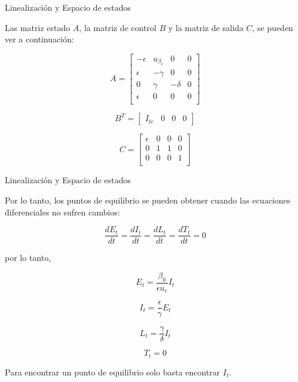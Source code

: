 \documentclass{beamer}
\begin{document}
\begin{frame}{Linealización y Espacio de estados}
\begin{justify}


{\footnotesize

Las matriz estado $A$, la matriz de control $B$ y la matriz de salida $C$, se pueden ver a continuación:

$$
A = \begin{bmatrix}
-\epsilon & u_{\beta_{e}} & 0 & 0  \\
\epsilon & -\gamma & 0 & 0  \\
0 & \gamma  & -\delta & 0 \\
\epsilon & 0 & 0 & 0 \\
\end{bmatrix}
$$

\vspace{0.3cm}

$$
B^T = \begin{bmatrix}
I_{te} & 0 & 0 & 0
\end{bmatrix}
$$

\vspace{0.3cm}

$$
C = \begin{bmatrix}
\epsilon & 0 & 0 & 0  \\
0 & 1 & 1 & 0  \\
0 & 0  & 0 & 1 \\
\end{bmatrix}
$$
}

\end{justify}
\end{frame}



\begin{frame}{Linealización y Espacio de estados}
\begin{justify}


{\footnotesize

Por lo tanto, los puntos de equilibrio se pueden obtener cuando las ecuaciones diferenciales no sufren cambios:


$$\frac{dE_{t}}{dt} = \frac{dI_{t}}{dt} = \frac{dL_{t}}{dt} = \frac{dT_{t}}{dt} = 0$$

por lo tanto,

$$E_{t}=\frac{\beta_{0}}{\epsilon u_e}I_{t}$$

$$I_{t}=\frac{\epsilon}{\gamma}E_{t}$$

$$L_{t}=\frac{\gamma}{\delta}I_{t}$$

$$T_{t} = 0 $$

Para encontrar un punto de equilibrio solo basta encontrar $I_{t}$.
}

\end{justify}
\end{frame}
\end{document}
